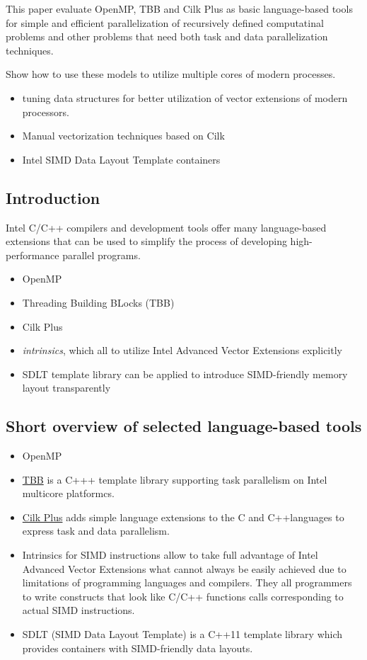 \documentclass[11pt]{article}
\begin{document}
This paper evaluate OpenMP, TBB and Cilk Plus as basic language-based tools for simple and efficient parallelization of recursively defined computatinal problems and other problems that need both task and data parallelization techniques.

Show how to use these models to utilize multiple cores of modern processes.
\begin{itemize}
\item tuning data structures for better utilization of vector extensions of modern processors.
\item Manual vectorization techniques based on Cilk
\item Intel SIMD Data Layout Template containers
\end{itemize}

\subsection{Introduction}
\label{sec-5-1}
Intel C/C++ compilers and development tools offer many language-based extensions that can be used to simplify the process of developing high-performance parallel programs.
\begin{itemize}
\item OpenMP
\item Threading Building BLocks (TBB)
\item Cilk Plus
\item \emph{intrinsics}, which all to utilize Intel Advanced Vector Extensions explicitly
\item SDLT template library can be applied to introduce SIMD-friendly memory layout transparently
\end{itemize}

\subsection{Short overview of selected language-based tools}
\label{sec-5-2}
\begin{itemize}
\item OpenMP
\item \href{https://www.threadingbuildingblocks.org}{TBB} is a C+++ template library supporting task parallelism on Intel multicore platformcs.
\item \href{https://www.cilkplus.org}{Cilk Plus} adds simple language extensions to the C and C++languages to express task and data parallelism.
\item Intrinsics for SIMD instructions allow to take full advantage of Intel Advanced Vector Extensions what cannot always be easily achieved due to limitations of programming languages and compilers. They all programmers to write constructs that look like C/C++ functions calls corresponding to actual SIMD instructions.
\item SDLT (SIMD Data Layout Template) is a C++11 template library which provides containers with SIMD-friendly data layouts.
\end{itemize}
\end{document}
